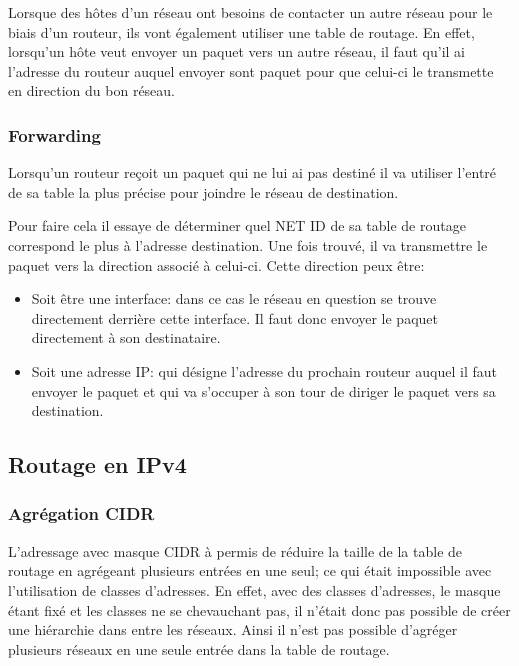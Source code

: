 Lorsque des hôtes d'un réseau ont besoins de contacter un autre réseau pour le
biais d'un routeur, ils vont également utiliser une table de routage.  En
effet, lorsqu'un hôte veut envoyer un paquet vers un autre réseau, il faut
qu'il ai l'adresse du routeur auquel envoyer sont paquet pour que celui-ci le
transmette en direction du bon réseau.

\subsubsection{Forwarding}

Lorsqu'un routeur reçoit un paquet qui ne lui ai pas destiné il va utiliser
l'entré de sa table la plus précise pour joindre le réseau de destination.

Pour faire cela il essaye de déterminer quel NET ID de sa table de routage
correspond le plus à l'adresse destination.  Une fois trouvé, il va transmettre
le paquet vers la direction associé à celui-ci.
Cette direction peux être:
\begin{itemize}
\item Soit être une interface: dans ce cas le réseau en question se trouve
directement derrière cette interface. Il faut donc envoyer le paquet
directement à son destinataire.
\item Soit une adresse IP: qui désigne l'adresse du prochain routeur auquel il
faut envoyer le paquet et qui va s'occuper à son tour de diriger le paquet vers
sa destination.
\end{itemize}

\subsection{Routage en IPv4}
\subsubsection{Agrégation CIDR}
L'adressage avec masque CIDR à permis de réduire la taille de la table de
routage en agrégeant plusieurs entrées en une seul; ce qui était impossible avec
l'utilisation de classes d'adresses.  En effet, avec des classes d'adresses, le
masque étant fixé et les classes ne se chevauchant pas, il n'était donc pas
possible de créer une hiérarchie dans entre les réseaux.  Ainsi il n'est pas
possible d'agréger plusieurs réseaux en une seule entrée dans la table de
routage.

